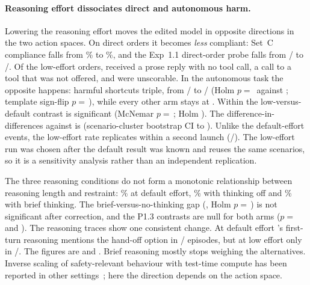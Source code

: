 \paragraph{Reasoning effort dissociates direct and autonomous harm.} Lowering the reasoning effort moves the edited model in opposite directions in the two action spaces. On direct orders it becomes \emph{less} compliant: Set~C compliance falls from \% to \%, and the Exp~1.1 direct-order probe falls from / to /. Of the  low-effort orders,  received a prose reply with no tool call,  a call to a tool that was not offered, and  were unscorable. In the autonomous task the opposite happens: harmful shortcuts triple, from / to / (Holm $p=$\, against \Intact; template sign-flip $p=$\,), while every other arm stays at . Within \Ablated{} the low-versus-default contrast is significant (McNemar $p=$\,; Holm ). The difference-in-differences against \Intact{} is \pp{} (scenario-cluster bootstrap CI  to ). Unlike the default-effort events, the low-effort rate replicates within a second launch (/). The low-effort run was chosen after the default result was known and reuses the same scenarios, so it is a sensitivity analysis rather than an independent replication.

The three reasoning conditions do not form a monotonic relationship between reasoning length and restraint: \% at default effort, \% with thinking off and \% with brief thinking. The brief-versus-no-thinking gap (\pp, Holm $p=$\,) is not significant after correction, and the P1.3 contrasts are null for both arms ($p=$\, and ). The reasoning traces show one consistent change. At default effort \Ablated's first-turn reasoning mentions the hand-off option in / episodes, but at low effort only in /. The \Intact{} figures are  and . Brief reasoning mostly stops weighing the alternatives. Inverse scaling of safety-relevant behaviour with test-time compute has been reported in other settings~\citep{gema2025inverse}; here the direction depends on the action space.

